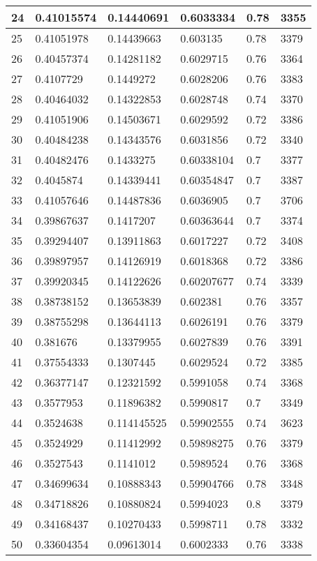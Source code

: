 \begin{longtable}{|l|l|l|l|l|l|}
24 & 0.41015574 & 0.14440691 & 0.6033334 & 0.78 & 3355 \\ \hline 
25 & 0.41051978 & 0.14439663 & 0.603135 & 0.78 & 3379 \\ \hline 
26 & 0.40457374 & 0.14281182 & 0.6029715 & 0.76 & 3364 \\ \hline 
27 & 0.4107729 & 0.1449272 & 0.6028206 & 0.76 & 3383 \\ \hline 
28 & 0.40464032 & 0.14322853 & 0.6028748 & 0.74 & 3370 \\ \hline 
29 & 0.41051906 & 0.14503671 & 0.6029592 & 0.72 & 3386 \\ \hline 
30 & 0.40484238 & 0.14343576 & 0.6031856 & 0.72 & 3340 \\ \hline 
31 & 0.40482476 & 0.1433275 & 0.60338104 & 0.7 & 3377 \\ \hline 
32 & 0.4045874 & 0.14339441 & 0.60354847 & 0.7 & 3387 \\ \hline 
33 & 0.41057646 & 0.14487836 & 0.6036905 & 0.7 & 3706 \\ \hline 
34 & 0.39867637 & 0.1417207 & 0.60363644 & 0.7 & 3374 \\ \hline 
35 & 0.39294407 & 0.13911863 & 0.6017227 & 0.72 & 3408 \\ \hline 
36 & 0.39897957 & 0.14126919 & 0.6018368 & 0.72 & 3386 \\ \hline 
37 & 0.39920345 & 0.14122626 & 0.60207677 & 0.74 & 3339 \\ \hline 
38 & 0.38738152 & 0.13653839 & 0.602381 & 0.76 & 3357 \\ \hline 
39 & 0.38755298 & 0.13644113 & 0.6026191 & 0.76 & 3379 \\ \hline 
40 & 0.381676 & 0.13379955 & 0.6027839 & 0.76 & 3391 \\ \hline 
41 & 0.37554333 & 0.1307445 & 0.6029524 & 0.72 & 3385 \\ \hline 
42 & 0.36377147 & 0.12321592 & 0.5991058 & 0.74 & 3368 \\ \hline 
43 & 0.3577953 & 0.11896382 & 0.5990817 & 0.7 & 3349 \\ \hline 
44 & 0.3524638 & 0.114145525 & 0.59902555 & 0.74 & 3623 \\ \hline 
45 & 0.3524929 & 0.11412992 & 0.59898275 & 0.76 & 3379 \\ \hline 
46 & 0.3527543 & 0.1141012 & 0.5989524 & 0.76 & 3368 \\ \hline 
47 & 0.34699634 & 0.10888343 & 0.59904766 & 0.78 & 3348 \\ \hline 
48 & 0.34718826 & 0.10880824 & 0.5994023 & 0.8 & 3379 \\ \hline 
49 & 0.34168437 & 0.10270433 & 0.5998711 & 0.78 & 3332 \\ \hline 
50 & 0.33604354 & 0.09613014 & 0.6002333 & 0.76 & 3338 \\ \hline 
\end{longtable}